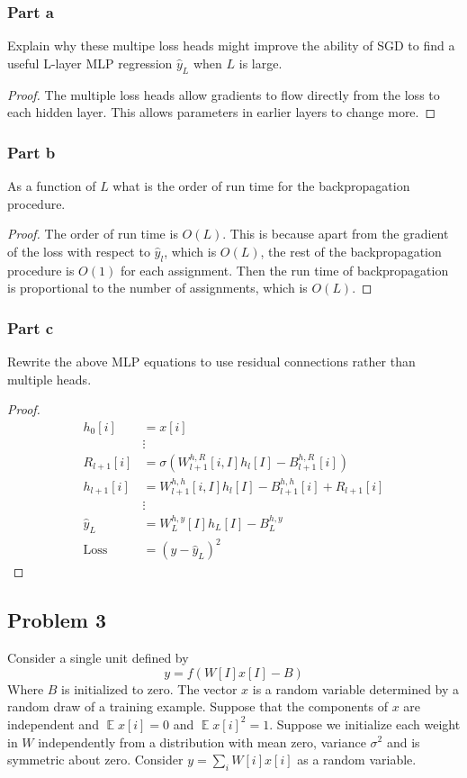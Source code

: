 \documentclass{amsart}
\DeclareMathOperator{\ee}{\mathbb{E}}
\theoremstyle{definition}
\begin{document}
\subsubsection*{Part a} Explain why these multipe loss heads might improve the ability of SGD to find a useful L-layer MLP regression $\hat{y}_L$ when $L$ is large. 
\begin{proof}
  The multiple loss heads allow gradients to flow directly from the loss to each hidden layer. 
  This allows parameters in earlier layers to change more. 
\end{proof}
\subsubsection*{Part b} As a function of $L$ what is the order of run time for the backpropagation procedure. 
\begin{proof}
  The order of run time is $O(L)$. This is because apart from the gradient of the loss with respect to $\hat{y}_l$, which is $O(L)$, 
  the rest of the backpropagation procedure is $O(1)$ for each assignment. 
  Then the run time of backpropagation is proportional to the number of assignments, which is $O(L)$.
\end{proof}

\subsubsection*{Part c} Rewrite the above MLP equations to use residual connections rather than multiple heads.
\begin{proof}
  \begin{align*}
    h_0[i] &= x[i]\\
    &\vdots \\
    R_{l + 1}[i] &= \sigma(W_{l + 1}^{h, R}[i, I] h_{l}[I] - B_{l + 1}^{h,R}[i]) \\
    h_{l + 1}[i] &= W_{l + 1}^{h, h}[i, I] h_{l}[I] - B_{l + 1}^{h,h}[i] + R_{l + 1}[i]\\
    & \vdots \\
    \hat{y}_L &= W_{L}^{h, y} [I] h_{L}[I] - B_{L}^{h, y}\\
    \mathrm{Loss} &= (y - \hat{y}_L)^2
  \end{align*}
\end{proof}

\subsection*{Problem 3}
Consider a single unit defined by 
\[
y = f(W[I]x[I] - B) 
\]
Where $B$ is initialized to zero. 
The vector $x$ is a random variable determined by a random draw of a training example. 
Suppose that the components of $x$ are independent and $\ee{x[i]} = 0$ and $\ee{x[i]^2} = 1$.
Suppose we initialize each weight in $W$ independently from a distribution with mean zero, variance $\sigma^2$  and is symmetric about zero.
Consider $y = \sum_i W[i]x[i]$ as a random variable. 
\end{document}
